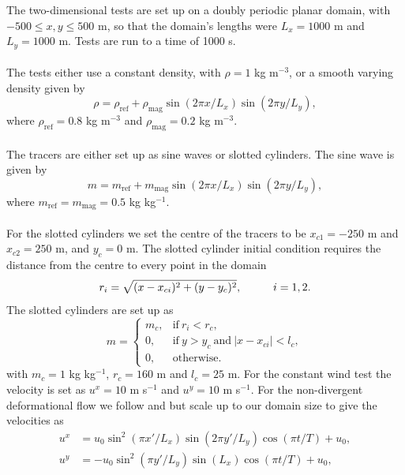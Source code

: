 \documentclass[11pt,a4paper]{article}
\begin{document}
The two-dimensional tests are set up on a doubly periodic planar domain, with $-500 \leq x,y \leq 500$ m, so that the domain's lengths were $L_x=1000$ m and $L_y=1000$ m.
Tests are run to a time of 1000 s.
\\
\\
The tests either use a constant density, with $\rho=1$ kg m$^{-3}$, or a smooth varying density given by
\begin{equation}
    \rho = \rho_{\mathrm{ref}} + \rho_{\mathrm{mag}} \sin(2 \pi x/L_x) \sin(2 \pi y/L_y),
\end{equation}
where $\rho_{\mathrm{ref}}=0.8$ kg m$^{-3}$ and $\rho_{\mathrm{mag}}=0.2$ kg m$^{-3}$. \\ 
\\
The tracers are either set up as sine waves or slotted cylinders. The sine wave is given by
\begin{equation}
    m = m_{\mathrm{ref}} + m_{\mathrm{mag}} \sin(2 \pi x/L_x) \sin(2 \pi y/L_y),
\end{equation} 
where $m_{\mathrm{ref}}=m_{\mathrm{mag}}=0.5$ kg kg$^{-1}$. \\
\\
For the slotted cylinders we set the centre of the tracers to be $x_{c1} = -250$ m and $x_{c2}=250$ m, and $y_c=0$ m.
The slotted cylinder initial condition requires the distance from the centre to every point in the domain
\begin{equation}
    r_i = \sqrt{(x-x_{ci})^2+(y-y_c)^2}, \hspace*{1cm} i=1,2.
\end{equation}
The slotted cylinders are set up as
\begin{equation}
    m = 
    \begin{cases}
        m_c, & \mathrm{if} \ r_i < r_c, \\
        0, & \mathrm{if} \ y>y_c \ \mathrm{and} \ |x-x_{ci}|<l_c, \\
        0, & \mathrm{otherwise}.
    \end{cases}
\end{equation}
with $m_c=1$ kg kg$^{-1}$, $r_c=160$ m and $l_c=25$ m.
For the constant wind test the velocity is set as $u^x=10$ m s$^{-1}$ and $u^y=10$ m s$^{-1}$. For the non-divergent deformational flow we follow \cite{skamarock2006limiters} and \citet{kent2020positive} but scale up to our domain size to give the velocities as
\begin{subequations}
\begin{align}
u^x & =  u_0 \sin^2(\pi x'/L_x)\sin(2 \pi y'/L_y)\cos(\pi t/T)+u_0,\\ 
u^y & = -u_0 \sin^2(\pi y'/L_y)\sin(L_x)\cos(\pi t/T)+u_0,
\end{align}
\end{subequations}
\end{document}
